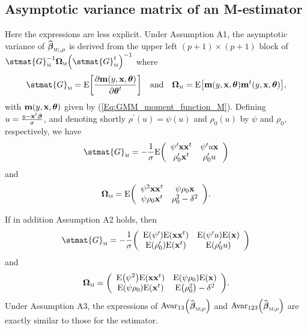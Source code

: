 \subsection{Asymptotic variance matrix of an M-estimator}

Here the expressions are less explicit. Under Assumption A1, the asymptotic
variance of $\sthat{\boldsymbol\beta}_{\stsc{M};,\rho}$ is derived from
the upper left $(p+1)\times(p+1)$ block of $\stmat{G}_{\stsc{M}}%
^{-1}\boldsymbol{\Omega}_{\stsc{M}}\left(  \stmat{G}_{\stsc{M}}%
^{t}\right)  ^{-1}$ where
\[
\stmat{G}_{\stsc{M}}=\mathrm{E}\left[  \frac{\partial\mathbf{m}\left(
y,\stvec{x},\boldsymbol{\theta}\right)  }{\partial\boldsymbol{\theta}^{t}%
}\right]  \quad\text{and}\quad\boldsymbol{\Omega}_{\stsc{M}}=\mathrm{E}%
\left[  \mathbf{m}\left(  y,\stvec{x},\boldsymbol{\theta}\right)
\mathbf{m}^{t}\left(  y,\stvec{x},\boldsymbol{\theta}\right)  \right]  ,
\]
with $\mathbf{m}\left(  y,\stvec{x},\boldsymbol{\theta}\right)  $ given by
(\ref{Eq:GMM_moment_function_M}). Defining $u=\frac{y-\stvec{x}%
^{t}\boldsymbol\beta}{\sigma}$, and denoting shortly $\rho^{\prime}%
(u)=\psi(u)$ and $\rho_{0}(u)$ by $\psi$ and $\rho_{0}$, respectively, we
have
\[
\stmat{G}_{\stsc{M}}=-\frac{1}{\sigma}\mathrm{E}\left(
\begin{array}
[c]{cc}%
\psi^{\prime}\mathbf{xx}^{t} & \psi^{\prime}u\stvec{x}\\
\rho_{0}^{\prime}\stvec{x}^{t} & \rho_{0}^{\prime}u
\end{array}
\right)
\]
and
\[
\boldsymbol{\Omega}_{\stsc{M}}=\mathrm{E}\left(
\begin{array}
[c]{cc}%
\psi^{2}\mathbf{xx}^{t} & \psi\rho_{0}\stvec{x}\\
\psi\rho_{0}\stvec{x}^{t} & \rho_{0}^{2}-\delta^{2}%
\end{array}
\right)  .
\]


If in addition Assumption A2 holds, then
\[
\stmat{G}_{\stsc{M}}=-\frac{1}{\sigma}\left(
\begin{array}
[c]{cc}%
\mathrm{E}\left(  \psi^{\prime}\right)  \mathrm{E}\left(  \mathbf{xx}%
^{t}\right)  & \mathrm{E}\left(  \psi^{\prime}u\right)  \mathrm{E}\left(
\stvec{x}\right) \\
\mathrm{E}\left(  \rho_{0}^{\prime}\right)  \mathrm{E}\left(  \stvec{x}%
^{t}\right)  & \mathrm{E}\left(  \rho_{0}^{\prime}u\right)
\end{array}
\right)
\]
and
\[
\boldsymbol{\Omega}_{\stsc{M}}=\left(
\begin{array}
[c]{cc}%
\mathrm{E}\left(  \psi^{2}\right)  \mathrm{E}\left(  \mathbf{xx}^{t}\right)  &
\mathrm{E}\left(  \psi\rho_{0}\right)  \mathrm{E}\left(  \stvec{x}\right) \\
\mathrm{E}\left(  \psi\rho_{0}\right)  \mathrm{E}\left(  \stvec{x}^{t}\right)
& \mathrm{E}\left(  \rho_{0}^{2}\right)  -\delta^{2}%
\end{array}
\right)  .
\]
Under Assumption A3, the expressions of $\mathrm{Avar}_{13}\left(
\sthat{\boldsymbol\beta}_{\stsc{M};\rho}\right)  $ and $\mathrm{Avar}%
_{123}\left(  \sthat{\boldsymbol\beta}_{\stsc{M};\rho}\right)  $ are
exactly similar to those for the  estimator.

